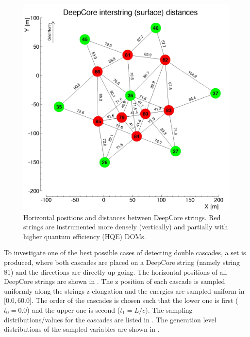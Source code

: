 \begin{figure}
    \centering
    \includegraphics{figures/icecube_deepcore/deepcore_surface_distances.jpg}
    \caption[xx]{Horizontal positions and distances between DeepCore strings. Red strings are instrumented more densely (vertically) and partially with higher quantum efficiency (HQE) DOMs.}
\end{figure}

To investigate one of the best possible cases of detecting double cascades, a set is produced, where both cascades are placed on a DeepCore string (namely string 81) and the directions are directly up-going. The horizontal positions of all DeepCore strings are shown in . The z position of each cascade is sampled uniformly along the strings z elongation and the energies are sampled uniform in [$0.0, 60.0$]\si{\gev}. The order of the cascades is chosen such that the lower one is first ($t_0=0.0$) and the upper one is second ($t_1=L/c$). The sampling distributions/values for the cascades are listed in . The generation level distributions of the sampled variables are shown in .


